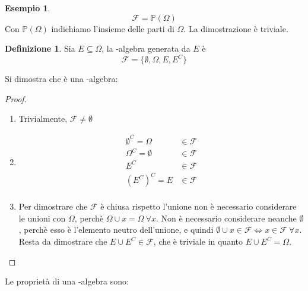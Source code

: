 \documentclass{article}
\theoremstyle{plain}
\theoremstyle{definition}
\newtheorem{definizione}{Definizione}[section]
\newtheorem{esempio}{Esempio}[section]
\theoremstyle{remark}
\begin{document}
\begin{esempio}
	\begin{equation*}
		\mathcal{F}=\mathds{P}(\Omega)
	\end{equation*}
	Con $\mathds{P}(\Omega)$ indichiamo l'insieme delle parti di $\Omega$. La dimostrazione è triviale.
\end{esempio}
\begin{definizione}
	Sia $E\subseteq\Omega$, la \sigma-algebra generata da $E$ è
	\begin{equation*}
		\mathcal{F}=\{\emptyset,\Omega,E,E^C\}
	\end{equation*}
\end{definizione}
Si dimostra che è una \sigma-algebra:
\begin{proof}
	\begin{enumerate}
		\item Trivialmente, $\mathcal{F}\neq\emptyset$
		\item 
		\begin{align*}
			\emptyset^C=\Omega&\in\mathcal{F}\\
			\Omega^C=\emptyset&\in\mathcal{F}\\
			E^C&\in\mathcal{F}\\
			(E^C)^C=E&\in\mathcal{F}\\
		\end{align*}
		\item Per dimostrare che $\mathcal{F}$ è chiusa rispetto l'unione non è necessario considerare le unioni con $\Omega$, perchè $\Omega\cup x=\Omega\ \forall x$. Non è necessario considerare neanche $\emptyset$, perchè esso è l'elemento neutro dell'unione, e quindi $\emptyset\cup x\in\mathcal{F}\Leftrightarrow x\in\mathcal{F}\ \forall x$. Resta da dimostrare che $E\cup E^C\in\mathcal{F}$, che è triviale in quanto $E\cup E^C=\Omega$.
	\end{enumerate}
\end{proof}
Le proprietà di una \sigma-algebra sono:
\end{document}
